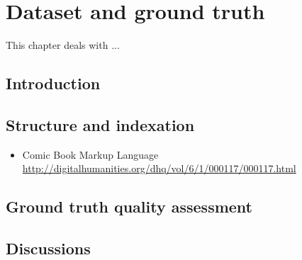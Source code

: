 \chapter{Dataset and ground truth} %
\label{chap:gt}
\graphicspath{{./chapters/9-gt/figs/}}
This chapter\cite{Guerin2013} deals with ...

\section{Introduction}
\label{sec:gt:intro}


\section{Structure and indexation}
\label{sec:gt:structure_indexation}

\begin{itemize}
	\item Comic Book Markup Language \url{http://digitalhumanities.org/dhq/vol/6/1/000117/000117.html}
\end{itemize}

\section{Ground truth quality assessment}
\label{sec:gt:ground_truth_quality_assessment}


\section{Discussions}
\label{sec:gt:siscussions}


